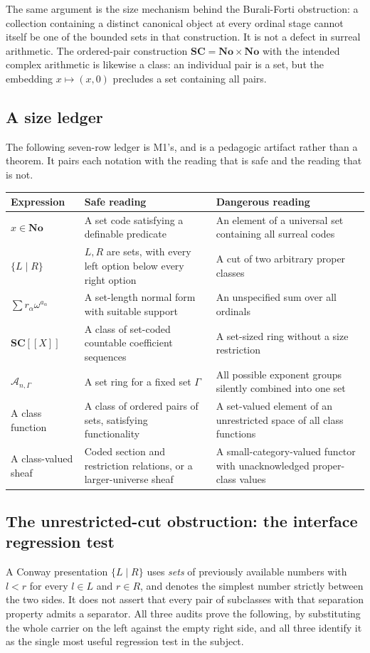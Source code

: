 \documentclass[11pt,letterpaper]{article}
\numberwithin{equation}{section}
\theoremstyle{definition}
\theoremstyle{remark}
\newcommand{\No}{\mathbf{No}}
\newcommand{\SC}{\mathbf{SC}}
\newcommand{\Ag}{\mathscr A}
\begin{document}
The same argument is the size mechanism behind the Burali-Forti obstruction: a
collection containing a distinct canonical object at every ordinal stage cannot
itself be one of the bounded sets in that construction. It is not a defect in
surreal arithmetic. The ordered-pair construction $\SC=\No\times\No$ with the
intended complex arithmetic is likewise a class: an individual pair is a set,
but the embedding $x\mapsto(x,0)$ precludes a set containing all pairs.

\subsection{A size ledger}
\label{found:sub:sizeledger}
The following seven-row ledger is M1's, and is a pedagogic artifact rather than
a theorem. It pairs each notation with the reading that is safe and the reading
that is not.

\begin{longtable}{@{}P{0.25\textwidth}P{0.31\textwidth}P{0.36\textwidth}@{}}
\toprule
Expression & Safe reading & Dangerous reading\\
\midrule\endhead
$x\in\No$ & A set code satisfying a definable predicate & An element of a universal set containing all surreal codes\\[0.4em]
$\{L\mid R\}$ & $L,R$ are sets, with every left option below every right option & A cut of two arbitrary proper classes\\[0.4em]
$\sum r_\alpha\omega^{a_\alpha}$ & A set-length normal form with suitable support & An unspecified sum over all ordinals\\[0.4em]
$\SC[[X]]$ & A class of set-coded countable coefficient sequences & A set-sized ring without a size restriction\\[0.4em]
$\Ag_{n,\Gamma}$ & A set ring for a fixed set $\Gamma$ & All possible exponent groups silently combined into one set\\[0.4em]
A class function & A class of ordered pairs of sets, satisfying functionality & A set-valued element of an unrestricted space of all class functions\\[0.4em]
A class-valued sheaf & Coded section and restriction relations, or a larger-universe sheaf & A small-category-valued functor with unacknowledged proper-class values\\
\bottomrule
\end{longtable}

\subsection{The unrestricted-cut obstruction: the interface regression test}
\label{found:sub:cutobstruction}
A Conway presentation $\{L\mid R\}$ uses \emph{sets} of previously available
numbers with $l<r$ for every $l\in L$ and $r\in R$, and denotes the simplest
number strictly between the two sides. It does not assert that every pair of
subclasses with that separation property admits a separator. All three audits
prove the following, by substituting the whole carrier on the left against the
empty right side, and all three identify it as the single most useful
regression test in the subject.
\end{document}
